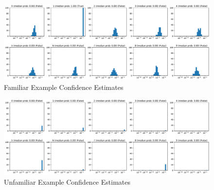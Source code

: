 \begin{figure}[!htb]
  \centering
  \includegraphics[width=\columnwidth]{Figures/familiar_example_confidence.pdf}
  \caption{Familiar Example Confidence Estimates}
  \label{fig:familiar_example_confidence}
\end{figure}

\begin{figure}[!htb]
  \centering
  \includegraphics[width=\columnwidth]{Figures/mnist_confidence.pdf}
  \caption{Unfamiliar Example Confidence Estimates}
  \label{fig:unfamiliar_example_confidence}
\end{figure}

